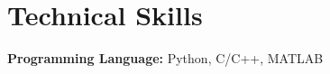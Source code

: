 \documentclass[a4paper,11pt]{article}
\makeatletter
\newcommand{\resumeItem}[1]{
  \item\small{
    {#1 \vspace{-2pt}}
  }
}
\newcommand{\resumeSubSubheading}[2]{
    \item
    \begin{tabular*}{0.97\textwidth}{l@{\extracolsep{\fill}}r}
      \textit{\small#1} & \textit{\small #2} \\
    \end{tabular*}\vspace{-7pt}
}
\newcommand{\resumeSubHeadingListEnd}{\end{itemize}}
\newcommand{\resumeItemListStart}{\begin{itemize}}
\newcommand{\resumeItemListEnd}{\end{itemize}\vspace{-5pt}}
\makeatother
\begin{document}



\section{Technical Skills}

\begin{itemize}[leftmargin=0.15in, label={}, itemsep=0pt, parsep=0pt]
    \small{\item{\textbf{Programming Language:} Python, C/C++, MATLAB}}
\end{itemize}



\end{document}
